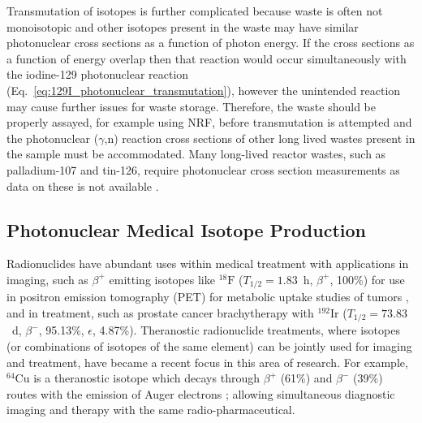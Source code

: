 \documentclass[../main.tex]{subfiles}
\begin{document}
Transmutation of isotopes is further complicated because waste is often not monoisotopic and other isotopes present in the waste may have similar photonuclear cross sections as a function of photon energy. If the cross sections as a function of energy overlap then that reaction would occur simultaneously with the iodine-129 photonuclear reaction (Eq.~\ref{eq:129I_photonuclear_transmutation}), however the unintended reaction may cause further issues for waste storage. Therefore, the waste should be properly assayed, for example using NRF, before transmutation is attempted and the photonuclear ($\gamma$,n) reaction cross sections of other long lived wastes present in the sample must be accommodated. Many long-lived reactor wastes, such as palladium-107 and tin-126, require photonuclear cross section measurements as data on these is not available \cite{zerkin2018experimental}. 

\subsection{Photonuclear Medical Isotope Production}
\label{sec:photonuclear_medical_isotope_production}

Radionuclides have abundant uses within medical treatment with applications in imaging, such as $\beta^{+}$ emitting isotopes like $^{18}\mathrm{F}$ ($T_{1/2}=1.83$~\si{\hour}, $\beta^{+}$, 100\%) for use in positron emission tomography (PET) for metabolic uptake studies of tumors \cite{orlhac2014tumor}, and in treatment, such as prostate cancer brachytherapy \cite{yuan2021proof} with $^{192}\textrm{Ir}$ ($T_{1/2} =73.83$~\si{\day}, $\beta^{-}$, 95.13\%, $\epsilon$, 4.87\%). Theranostic \cite{svenson2013theranostics} radionuclide treatments, where isotopes (or combinations of isotopes of the same element) can be jointly used for imaging and treatment, have became a recent focus in this area of research. For example, $^{64}\mathrm{Cu}$ is a theranostic isotope which decays through $\beta^{+}$ (61\%) and $\beta^{-}$ (39\%) routes with the emission of Auger electrons \cite{boschi2018emerging}; allowing simultaneous diagnostic imaging and therapy with the same radio-pharmaceutical.
\end{document}
